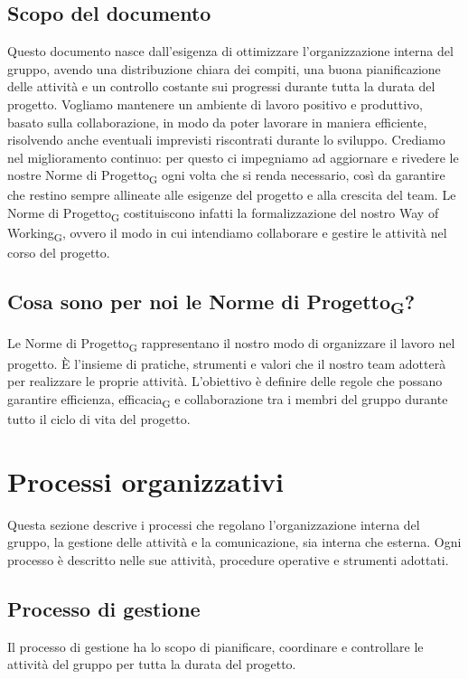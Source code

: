 \documentclass[11pt,a4paper]{article}
\newcommand{\gls}[1]{#1\textsubscript{G}}
\begin{document}
\subsection{Scopo del documento}
Questo documento nasce dall’esigenza di ottimizzare l’organizzazione interna del gruppo, avendo una distribuzione chiara dei compiti, una buona pianificazione delle attività e un controllo costante sui progressi durante tutta la durata del progetto. Vogliamo mantenere un ambiente di
lavoro positivo e produttivo, basato sulla collaborazione, in modo da poter lavorare in maniera efficiente, risolvendo anche eventuali imprevisti riscontrati durante lo sviluppo.
Crediamo nel miglioramento continuo: per questo ci impegniamo ad aggiornare e rivedere le nostre \gls{Norme di Progetto} ogni volta che si renda necessario, così da garantire che restino sempre allineate alle esigenze del progetto e alla crescita del team. Le \gls{Norme di Progetto} costituiscono infatti la formalizzazione del nostro \gls{Way of Working}, ovvero il modo in cui intendiamo collaborare e gestire le attività nel corso del progetto.

\subsection{Cosa sono per noi le \gls{Norme di Progetto}?}
Le \gls{Norme di Progetto} rappresentano il nostro modo di organizzare il lavoro nel progetto. È l’insieme di pratiche, strumenti e valori che il nostro team adotterà per realizzare le proprie attività. L’obiettivo è definire delle regole che possano garantire efficienza, \gls{efficacia} e collaborazione tra i membri del gruppo durante tutto il ciclo di vita del progetto.

\newpage

\section{Processi organizzativi}
Questa sezione descrive i processi che regolano l'organizzazione interna del gruppo, la gestione delle attività e la comunicazione, sia interna che esterna. Ogni processo è descritto nelle sue attività, procedure operative e strumenti adottati.

\subsection{Processo di gestione}
Il processo di gestione ha lo scopo di pianificare, coordinare e controllare
le attività del gruppo per tutta la durata del progetto.
\end{document}
